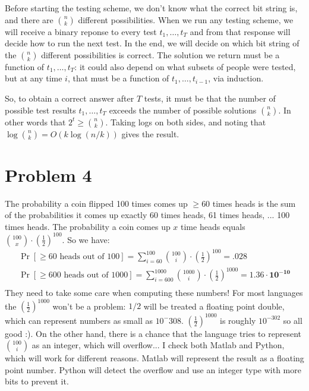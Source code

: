 \documentclass[11pt]{article}
\begin{document}
Before starting the testing scheme, we don't know what the correct bit string is, and there are ${n \choose k}$ different possibilities. When we run any testing scheme, we will receive a binary reponse to every test $t_1, \ldots, t_T$ and from that response will decide how to run the next test. In the end, we will decide on which bit string of the ${n \choose k}$ different possibilities is correct. The solution we return must be a function of $t_1, \ldots, t_T$: it could also depend on what subsets of people were tested, but at any time $i$, that must be a function of $t_1, \ldots, t_{i-1}$, via induction. 

So, to obtain a correct answer after $T$ tests, it must be that the number of possible test results $t_1, \ldots, t_T$ exceeds the number of possible solutions ${n \choose k}$. In other words that $2^t \geq {n \choose k}$. Taking logs on both sides, and noting that $\log{n \choose k}  = O(k\log(n/k))$ gives the result.

\section*{Problem 4}
The probability a coin flipped 100 times comes up $\geq 60$ times heads is the sum of the probabilities it comes up exactly 60 times heads, 61 times heads, ... 100 times heads. The probability a coin comes up $x$ time heads equals ${100 \choose x}\cdot (\frac{1}{2})^{100}$. So we have:
\begin{align*}
	\Pr[\geq 60 \text{ heads out of } 100] = \sum_{i=60}^{100} {100 \choose i}\cdot \left(\frac{1}{2}\right)^{100} = \mathbf{.028} \\
	\Pr[\geq 600 \text{ heads out of } 1000] = \sum_{i=600}^{1000} {1000 \choose i}\cdot \left(\frac{1}{2}\right)^{1000} = \mathbf{1.36 \cdot 10^{-10}} \\
\end{align*}
They need to take some care when computing these numbers! For most languages the $(\frac{1}{2})^{1000}$ won't be a problem: $1/2$ will be treated a floating point double, which can represent numbers as small as $10^-308$. $(\frac{1}{2})^{1000}$ is roughly $10^{-302}$ so all good :). On the other hand, there is a chance that the language tries to represent ${100 \choose i}$ as an integer, which will overflow... I check both Matlab and Python, which will work for different reasons. Matlab will represent the result as a floating point number. Python will detect the overflow and use an integer type with more bits to prevent it.
\end{document}
